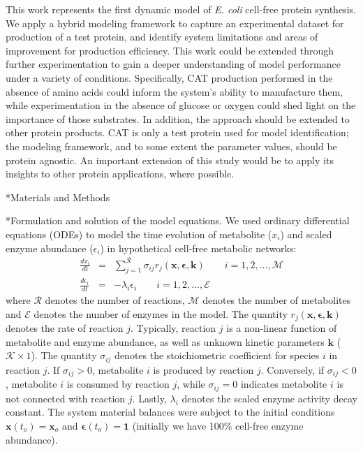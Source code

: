 \documentclass[12pt]{article}
\makeatletter
\renewcommand\subsection{\@startsection
	{subsection}{2}{0mm}
	{-0.05in}
	{-0.5\baselineskip}
	{\normalfont\normalsize\bfseries}}
\renewcommand\section{\@startsection
	{subsection}{2}{0mm}
	{-0.2in}
	{0.05\baselineskip}
	{\normalfont\large\bfseries}}
\makeatother
\begin{document}
This work represents the first dynamic model of \textit{E. coli} cell-free protein synthesis.
We apply a hybrid modeling framework to capture an experimental dataset for production of a test protein, and identify system limitations and areas of improvement for production efficiency.
This work could be extended through further experimentation to gain a deeper understanding of model performance under a variety of conditions.
Specifically, CAT production performed in the absence of amino acids could inform the system's ability to manufacture them, while experimentation in the absence of glucose or oxygen could shed light on the importance of those substrates.
In addition, the approach should be extended to other protein products.
CAT is only a test protein used for model identification; the modeling framework, and to some extent the parameter values, should be protein agnostic.
An important extension of this study would be to apply its insights to other protein applications, where possible.

\clearpage

\section*{Materials and Methods}

\subsection*{Formulation and solution of the model equations.}
We used ordinary differential equations (ODEs) to model the time evolution of metabolite ($x_{i}$) and scaled enzyme abundance ($\epsilon_{i}$) in hypothetical cell-free metabolic networks:
\begin{eqnarray}
	\frac{dx_{i}}{dt} & = & \sum_{j=1}^{\mathcal{R}}\sigma_{ij}r_{j}\left(\mathbf{x},\mathbf{\epsilon},\mathbf{k}\right)\qquad{i=1,2,\hdots,\mathcal{M}}\\
	\frac{d\epsilon_{i}}{dt} & = & -\lambda_{i}\epsilon_{i}\qquad{i=1,2,\hdots,\mathcal{E}}
\end{eqnarray}where $\mathcal{R}$ denotes the number of reactions, $\mathcal{M}$ denotes the number of metabolites and $\mathcal{E}$ denotes the number of enzymes in the model.
The quantity $r_{j}\left(\mathbf{x},\mathbf{\epsilon},\mathbf{k}\right)$ denotes the rate of reaction $j$.
Typically, reaction $j$ is a non-linear function of metabolite and enzyme abundance, as well as unknown kinetic parameters $\mathbf{k}$ ($\mathcal{K}\times{1}$).
The quantity $\sigma_{ij}$ denotes the stoichiometric coefficient for species $i$ in reaction $j$.
If $\sigma_{ij}>0$, metabolite $i$ is produced by reaction $j$.
Conversely, if $\sigma_{ij}<0$, metabolite $i$ is consumed by reaction $j$, while $\sigma_{ij}=0$ indicates metabolite $i$ is not connected with reaction $j$.
Lastly, $\lambda_{i}$ denotes the scaled enzyme activity decay constant.
The system material balances were subject to the initial conditions $\mathbf{x}\left(t_{o}\right)=\mathbf{x}_{o}$ and $\mathbf{\epsilon}\left(t_{o}\right)=\mathbf{1}$ (initially we have 100\% cell-free enzyme abundance).
\end{document}
